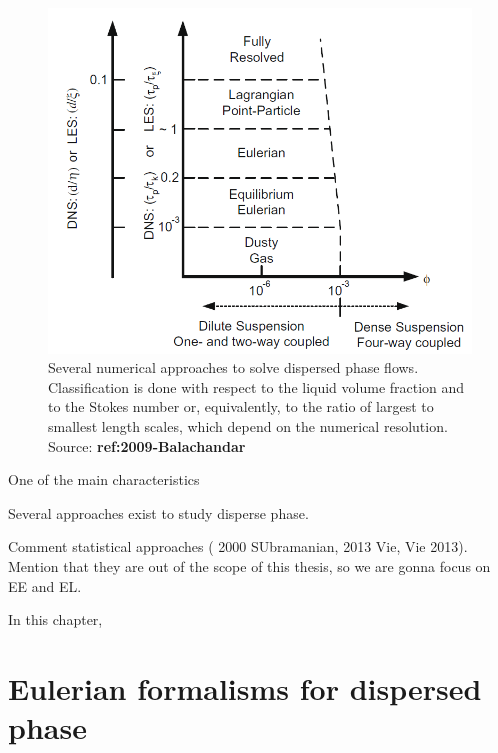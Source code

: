 \begin{figure}[h!]
	\centering
	\includegraphics[scale=0.5]{./part1_numerical_approaches/figures_ch3/balachandar_disperse_phase_classification}
	\caption{Several numerical approaches to solve dispersed phase flows. Classification is done with respect to the liquid volume fraction and to the Stokes number or, equivalently, to the ratio of largest to smallest length scales, which depend on the numerical resolution.  Source: \textbf{ref:2009-Balachandar}}
	\label{fig:balachandar_numerical_methods_representation}
\end{figure}


One of the main characteristics

Several approaches exist to study disperse phase. 

Comment statistical approaches ( 2000 SUbramanian, 2013 Vie, Vie 2013). Mention that they are out of the scope of this thesis, so we are gonna focus on EE and EL.



In this chapter, 

\section{Eulerian formalisms for dispersed phase}

